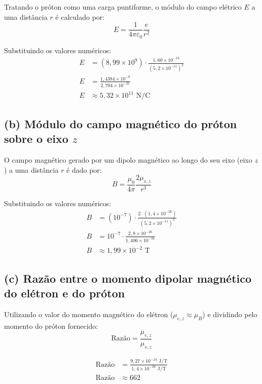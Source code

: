 \documentclass[12pt,a4paper]{article}
\begin{document}
Tratando o próton como uma carga puntiforme, o módulo do campo elétrico $E$ a uma distância $r$ é calculado por:
\begin{equation*}
E = \frac{1}{4\pi\varepsilon_0} \frac{e}{r^2}
\end{equation*}

Substituindo os valores numéricos:
\begin{align*}
E &= (8,99 \times 10^9) \cdot \frac{1,60 \times 10^{-19}}{(5,2 \times 10^{-11})^2} \\
E &= \frac{1,4384 \times 10^{-9}}{2,704 \times 10^{-21}} \\
E &\approx 5,32 \times 10^{11} \text{ N/C}
\end{align*}

\subsection*{(b) Módulo do campo magnético do próton sobre o eixo $z$}

O campo magnético gerado por um dipolo magnético ao longo do seu eixo (eixo $z$) a uma distância $r$ é dado por:
\begin{equation*}
B = \frac{\mu_0}{4\pi} \frac{2\mu_{s,z}}{r^3}
\end{equation*}

Substituindo os valores numéricos:
\begin{align*}
B &= (10^{-7}) \cdot \frac{2 \cdot (1,4 \times 10^{-26})}{(5,2 \times 10^{-11})^3} \\
B &= 10^{-7} \cdot \frac{2,8 \times 10^{-26}}{1,406 \times 10^{-31}} \\
B &\approx 1,99 \times 10^{-2} \text{ T}
\end{align*}

\subsection*{(c) Razão entre o momento dipolar magnético do elétron e do próton}

Utilizando o valor do momento magnético do elétron ($\mu_{e,z} \approx \mu_B$) e dividindo pelo momento do próton fornecido:
\begin{equation*}
\text{Razão} = \frac{\mu_{e,z}}{\mu_{s,z}}
\end{equation*}

\begin{align*}
\text{Razão} &= \frac{9,27 \times 10^{-24} \text{ J/T}}{1,4 \times 10^{-26} \text{ J/T}} \\
\text{Razão} &\approx 662
\end{align*}
\end{document}
